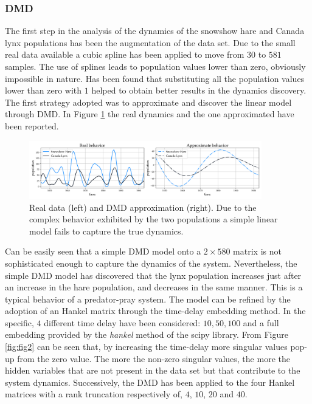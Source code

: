 \documentclass[]{article}
\begin{document}
\subsubsection{DMD}
The first step in the analysis of the dynamics of the snowshow hare and Canada lynx populations has been the augmentation of the data set. Due to the small real data available a cubic spline has been applied to move from $30$ to $581$ samples. The use of splines leads to population values lower than zero, obviously impossible in nature. Has been found that substituting all the population values lower than zero with $1$ helped to obtain better results in the dynamics discovery. The first strategy adopted was to approximate and discover the linear model through DMD. In Figure \ref{fig:fig1} the real dynamics and the one approximated have been reported.
\begin{figure}[!t]
\centering
\includegraphics[width=0.9\textwidth]{../figures/dmd.png}
\caption{Real data (left) and DMD approximation (right). Due to the complex behavior exhibited by the two populations a simple linear model fails to capture the true dynamics.}
\label{fig:fig1}
\end{figure}
Can be easily seen that a simple DMD model onto a $2 \times 580$ matrix is not sophisticated enough to capture the dynamics of the system. Nevertheless, the simple DMD model has discovered that the lynx population increases just after an increase in the hare population, and decreases in the same manner. This is a typical behavior of a predator-pray system. The model can be refined by the adoption of an Hankel matrix through the time-delay embedding method. In the specific, $4$ different time delay have been considered: $10, 50, 100$ and a full embedding provided by the \textit{hankel} method of the scipy library. From Figure \ref{fig:fig2} can be seen that, by increasing the time-delay more singular values pop-up from the zero value. The more the non-zero singular values, the more the hidden variables that are not present in the data set but that contribute to the system dynamics. Successively, the DMD has been applied to the four Hankel matrices with a rank truncation respectively of, $4$, $10$, $20$ and $40$.
\end{document}
